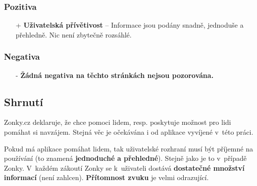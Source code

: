 \subsubsection*{Pozitiva}
\begin{itemize}
    \item[+] \textbf{Uživatelská přívětivost} -- Informace jsou podány snadně, jednoduše a přehledně. Nic není zbytečně rozsáhlé.
\end{itemize}
\subsubsection*{Negativa}
\begin{itemize}
    \item[-] \textbf{Žádná negativa na těchto stránkách nejsou pozorována.}
\end{itemize}



\subsection{Shrnutí}
Zonky.cz deklaruje, že chce pomoci lidem, resp. poskytuje možnost pro lidi pomáhat si navzájem. Stejná věc je očekávána i od aplikace vyvíjené v~této práci.

Pokud má aplikace pomáhat lidem, tak uživatelské rozhraní musí být příjemné na používání (to znamená \textbf{jednoduché a přehledné}). Stejně jako je to v~případě Zonky. V~každém zákoutí Zonky se k~uživateli dostává \textbf{dostatečné množství informací} (není zahlcen). \textbf{Přítomnost zvuku} je velmi odrazující.